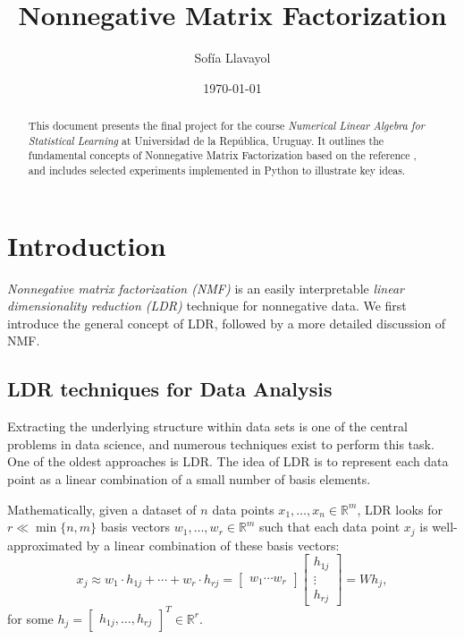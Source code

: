 \documentclass{amsart}
\title{Nonnegative Matrix Factorization}
\author{Sofía Llavayol}
\date{\today}
\newcommand{\R}{\mathbb{R}}
\begin{document}
\begin{abstract}
    This document presents the final project for the course \textit{Numerical Linear Algebra for Statistical Learning} at Universidad de la República, Uruguay. It outlines the fundamental concepts of Nonnegative Matrix Factorization based on the reference \cite{G}, and includes selected experiments implemented in Python to illustrate key ideas.
\end{abstract}


\maketitle

\section{Introduction}

{\it Nonnegative matrix factorization (NMF)} is an easily interpretable {\it linear dimensionality reduction (LDR)} technique for nonnegative data. We first introduce the general concept of LDR, followed by a more detailed discussion of NMF.

\subsection{LDR techniques for Data
Analysis}

Extracting the underlying structure within data sets is one of the central problems in data science, and numerous techniques exist to perform this task. One of the oldest approaches is LDR. The idea of LDR is to represent each data point as a linear combination of a small number of basis elements.

Mathematically, given a dataset of $n$ data points $x_1, \ldots, x_n \in\R^m$, LDR looks for $r\ll\min\{n,m\}$ basis vectors $w_1, \ldots, w_r \in\R^m$ such that each data point $x_j$ is well-approximated by a linear combination of these basis vectors:
\[
    x_j\approx w_1\cdot h_{1j} +\cdots +w_r\cdot h_{rj}=
    \begin{bmatrix}
        w_1 \cdots w_r
    \end{bmatrix}
    \begin{bmatrix}
        h_{1j}\\
        \vdots\\
        h_{rj}
    \end{bmatrix}= W h_j,
\]
for some $h_j= \begin{bmatrix} h_{1j}, \ldots, h_{rj} \end{bmatrix}^T \in\R^r$.
\end{document}
